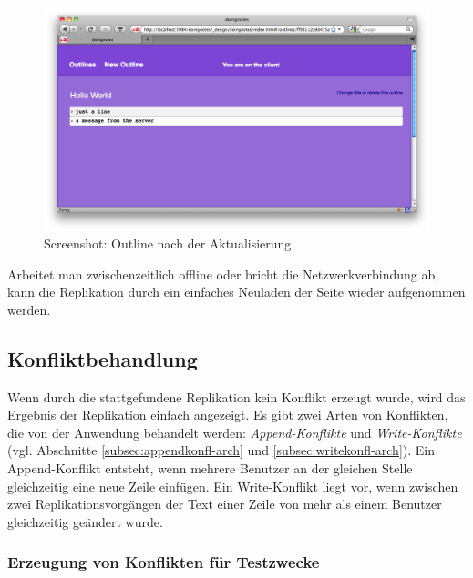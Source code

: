 \medskip
\begin{figure}[ht] 
  \begin{center}
  \includegraphics[width=\textwidth]{grafik/screenshot-updated-outline} 
  \end{center}
  \caption{Screenshot: Outline nach der Aktualisierung}
  \label{fig:outline-updated} 
\end{figure}


Arbeitet man zwischenzeitlich offline oder bricht die Netzwerkverbindung ab, kann die Replikation durch ein einfaches Neuladen der Seite wieder aufgenommen werden.


\afterpage{\clearpage}

\subsection{Konfliktbehandlung}
\label{subsec:conflres-anwendung}

Wenn durch die stattgefundene Replikation kein Konflikt erzeugt wurde, wird das Ergebnis der Replikation einfach angezeigt. Es gibt zwei Arten von Konflikten, die von der Anwendung behandelt werden: \textit{Append-Konflikte} und \textit{Write-Konflikte} (vgl. Abschnitte \ref{subsec:appendkonfl-arch} und \ref{subsec:writekonfl-arch}). Ein Append-Konflikt entsteht, wenn mehrere Benutzer an der gleichen Stelle gleichzeitig eine neue Zeile einfügen. Ein Write-Konflikt liegt vor, wenn zwischen zwei Replikationsvorgängen der Text einer Zeile von mehr als einem Benutzer gleichzeitig geändert wurde.

\subsubsection{Erzeugung von Konflikten für Testzwecke}

